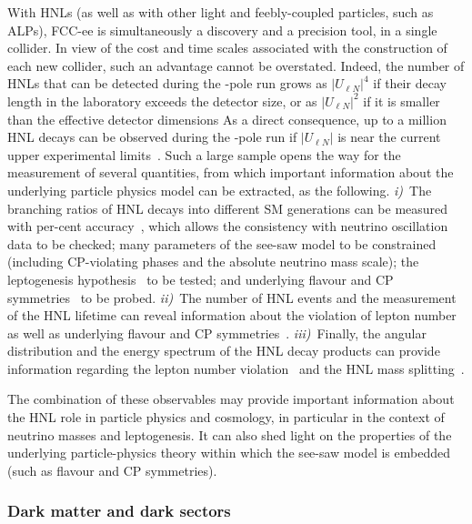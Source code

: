 With HNLs (as well as with other light and feebly-coupled particles, such as ALPs), 
FCC-ee is simultaneously a discovery and a precision tool, in a single collider. 
In view of the cost and time scales associated with the construction of each new collider, 
such an advantage cannot be overstated.
Indeed, the number of HNLs that can be detected during the \PZ-pole run 
grows as $|U_{\ell N}|^4$ if their decay length in the laboratory exceeds the detector size, 
or as $|U_{\ell N}|^2$ if it is smaller than the effective detector dimensions
As a direct consequence, 
up to a million HNL decays can be observed during the \mbox{\PZ-pole} run
if $|U_{\ell N}|$ is near the current upper experimental limits~\cite{Drewes:2022rsk}. 
%
Such a large sample opens the way for the measurement of several quantities, 
from which important information about the underlying particle physics model can be extracted,
as the following.
\textit{i)}~The branching ratios of HNL decays into different SM generations 
can be measured with per-cent accuracy~\cite{Antusch:2017pkq}, 
which allows the consistency with neutrino oscillation data to be checked;
many parameters of the see-saw model to be constrained~\cite{Drewes:2024bla} 
(including CP-violating phases and the absolute neutrino mass scale); 
the leptogenesis hypothesis~\cite{Antusch:2017pkq} to be tested; 
and underlying flavour and CP symmetries~\cite{Drewes:2024pad} to be probed.
\textit{ii)}~The number of HNL events and the measurement of the HNL lifetime 
can reveal information about the violation of lepton number~\cite{Blondel:2022qqo,Drewes:2022rsk} 
as well as underlying flavour and CP symmetries~\cite{Drewes:2024pad}.
\textit{iii)}~Finally, the angular distribution and the energy spectrum of the HNL decay products 
can provide information regarding the lepton number violation~\cite{Blondel:2021mss} 
and the HNL mass splitting~\cite{Antusch:2023jsa,Antusch:2024otj,note_HNL_Polesello_Valle}.

The combination of these observables may provide important information about the HNL role in particle physics and cosmology, 
in particular in the context of neutrino masses and leptogenesis. 
It can also shed light on the properties of the underlying particle-physics theory 
within which the see-saw model is embedded (such as flavour and CP symmetries). 

\subsubsection{Dark matter and dark sectors}
\label{sec:dark}

